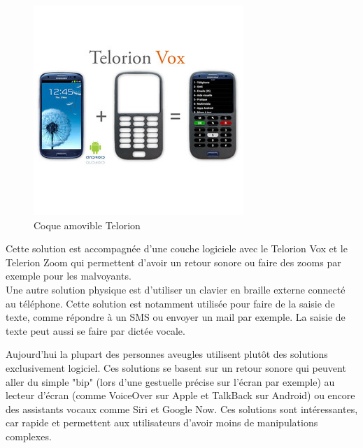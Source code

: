 \documentclass[UTF8]{EPURapport}
\begin{document}
\begin{figure}[h!]
\centering
  \includegraphics[width=\textwidth]{images/telorion_case.JPG}
  \caption{Coque amovible Telorion}
  \label{fig:telorioncase}
\end{figure}

Cette solution est accompagnée d'une couche logiciele avec le Telorion Vox et le Telerion Zoom qui permettent d'avoir un retour sonore ou faire des zooms par exemple pour les malvoyants. \\

Une autre solution physique est d'utiliser un clavier en braille externe connecté au téléphone. Cette solution est notamment utilisée pour faire de la saisie de texte, comme répondre à un SMS ou envoyer un mail par exemple. La saisie de texte peut aussi se faire par dictée vocale. 

Aujourd'hui la plupart des personnes aveugles utilisent plutôt des solutions exclusivement logiciel. Ces solutions se basent sur un retour sonore qui peuvent aller du simple "bip" (lors d'une gestuelle précise sur l'écran par exemple) au lecteur d'écran (comme VoiceOver sur Apple et TalkBack sur Android) ou encore des assistants vocaux comme Siri et Google Now. Ces solutions sont intéressantes, car rapide et permettent aux utilisateurs d'avoir moins de manipulations complexes.
\end{document}
